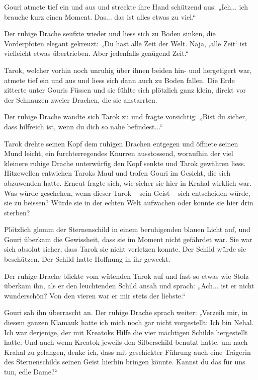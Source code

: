 \documentclass[10pt, a4paper, oneside]{book}
\begin{document}
Gouri atmete tief ein und aus und streckte ihre Hand schützend aus: „Ich... ich brauche kurz einen Moment. Das... das ist alles etwas zu viel.“

Der ruhige Drache seufzte wieder und liess sich zu Boden sinken, die Vorderpfoten elegant gekreuzt: „Du hast alle Zeit der Welt. Naja, ‚alle Zeit‘ ist vielleicht etwas übertrieben. Aber jedenfalls genügend Zeit.“

Tarok, welcher vorhin noch unruhig über ihnen beiden hin- und hergetigert war, atmete tief ein und aus und liess sich dann auch zu Boden fallen. Die Erde zitterte unter Gouris Füssen und sie fühlte sich plötzlich ganz klein, direkt vor der Schnauzen zweier Drachen, die sie anstarrten.

Der ruhige Drache wandte sich Tarok zu und fragte vorsichtig: „Bist du sicher, dass hilfreich ist, wenn du dich so nahe befindest...“

Tarok drehte seinen Kopf dem ruhigen Drachen entgegen und öffnete seinen Mund leicht, ein furchterregendes Knurren ausstossend, woraufhin der viel kleinere ruhige Drache unterwürfig den Kopf senkte und Tarok gewähren liess. Hitzewellen entwichen Taroks Maul und trafen Gouri im Gesicht, die sich abzuwenden hatte. Erneut fragte sich, wie sicher sie hier in Krahal wirklich war. Was würde geschehen, wenn dieser Tarok – sein Geist – sich entscheiden würde, sie zu beissen? Würde sie in der echten Welt aufwachen oder konnte sie hier drin sterben?

Plötzlich glomm der Sternenschild in einem beruhigenden blauen Licht auf, und Gouri überkam die Gewissheit, dass sie im Moment nicht gefährdet war. Sie war sich absolut sicher, dass Tarok sie nicht verletzen konnte. Der Schild würde sie beschützen. Der Schild hatte Hoffnung in ihr geweckt.

Der ruhige Drache blickte vom wütenden Tarok auf und fast so etwas wie Stolz überkam ihn, als er den leuchtenden Schild ansah und sprach: „Ach... ist er nicht wunderschön? Von den vieren war er mir stets der liebste.“

 Gouri sah ihn überrascht an. Der ruhige Drache sprach weiter: „Verzeih mir, in diesem ganzen Klamauk hatte ich mich noch gar nicht vorgestellt: Ich bin Nehal. Ich war derjenige, der mit Kreatoks Hilfe die vier mächtigen Schilde hergestellt hatte. Und auch wenn Kreatok jeweils den Silberschild benutzt hatte, um nach Krahal zu gelangen, denke ich, dass mit geschickter Führung auch eine Trägerin des Sternenschilds seinen Geist hierhin bringen könnte. Kannst du das für uns tun, edle Dame?“
\end{document}
